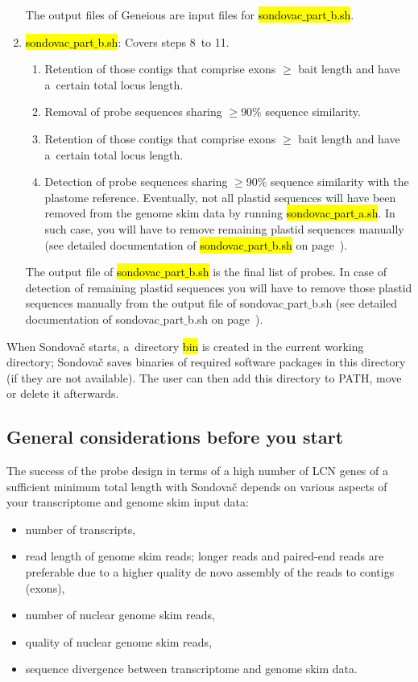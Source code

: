 \documentclass[a4paper, 11pt, twoside]{article}
\renewcommand{\texttt}[1]{\hl{\ttfamily #1}}
\begin{document}
\begin{enumerate}[label=\textbf{\Alph*.}]
  The output files of Geneious are input files for \texttt{sondovac$\_$part$\_$b.sh}.

  \item \texttt{sondovac$\_$part$\_$b.sh}: Covers steps 8~to 11.
    \begin{enumerate}[label=\textbf{\arabic*.}, resume]
      \item Retention of those contigs that comprise exons $\geq$ bait length and have a~certain total locus length.
      \item Removal of probe sequences sharing $\geq$90\% sequence similarity.
      \item Retention of those contigs that comprise exons $\geq$ bait length and have a~certain total locus length.
      \item Detection of probe sequences sharing $\geq$90\% sequence similarity with the plastome reference. Eventually, not all plastid sequences will have been removed from the genome skim data by running \texttt{sondovac$\_$part$\_$a.sh}. In such case, you will have to remove remaining plastid sequences manually (see detailed documentation of \texttt{sondovac$\_$part$\_$\-b.sh} on page~\pageref{partb}).
    \end{enumerate}

  The output file of \texttt{sondovac$\_$part$\_$b.sh} is the final list of probes. In case of detection of remaining plastid sequences you will have to remove those plastid sequences manually from the output file of sondovac$\_$part$\_$b.sh (see detailed documentation of sondovac$\_$part$\_$b.sh on page~\pageref{partb}).

\end{enumerate}

When Sondovač starts, a~directory \texttt{bin} is created in the current working directory; Sondovač saves binaries of required software packages in this directory (if they are not available). The user can then add this directory to PATH, move or delete it afterwards.

\subsection{General considerations before you start}

The success of the probe design in terms of a high number of LCN genes of a sufficient minimum total length with Sondovač depends on various aspects of your transcriptome and genome skim input data:
\begin{itemize}
  \item number of transcripts,
  \item read length of genome skim reads; longer reads and paired-end reads are preferable due to a higher 	quality de novo assembly of the reads to contigs (exons),
  \item number of nuclear genome skim reads,
  \item quality of nuclear genome skim reads,
  \item sequence divergence between transcriptome and genome skim data.
\end{itemize}
\end{document}

